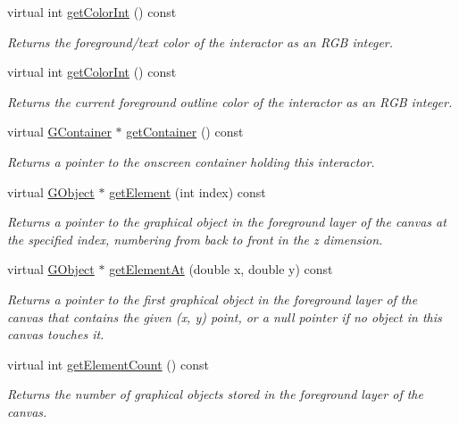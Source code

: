 \begin{DoxyCompactItemize}
virtual int \mbox{\hyperlink{classGInteractor_a9635c7af766cdc3417f346683fa0e6c1}{get\+Color\+Int}} () const
\begin{DoxyCompactList}\small\item\em Returns the foreground/text color of the interactor as an R\+GB integer. \end{DoxyCompactList}\item 
virtual int \mbox{\hyperlink{classGDrawingSurface_a9635c7af766cdc3417f346683fa0e6c1}{get\+Color\+Int}} () const
\begin{DoxyCompactList}\small\item\em Returns the current foreground outline color of the interactor as an R\+GB integer. \end{DoxyCompactList}\item 
virtual \mbox{\hyperlink{classGContainer}{G\+Container}} $\ast$ \mbox{\hyperlink{classGInteractor_a7a6e317c29d61030929b4cd2d1c00fe7}{get\+Container}} () const
\begin{DoxyCompactList}\small\item\em Returns a pointer to the onscreen container holding this interactor. \end{DoxyCompactList}\item 
virtual \mbox{\hyperlink{classGObject}{G\+Object}} $\ast$ \mbox{\hyperlink{classGCanvas_abde388cc529d22bb5f7f4a54d56049d8}{get\+Element}} (int index) const
\begin{DoxyCompactList}\small\item\em Returns a pointer to the graphical object in the foreground layer of the canvas at the specified index, numbering from back to front in the {\itshape z} dimension. \end{DoxyCompactList}\item 
virtual \mbox{\hyperlink{classGObject}{G\+Object}} $\ast$ \mbox{\hyperlink{classGCanvas_a25efa999eca5790ec26ef091b05f961c}{get\+Element\+At}} (double x, double y) const
\begin{DoxyCompactList}\small\item\em Returns a pointer to the first graphical object in the foreground layer of the canvas that contains the given (x, y) point, or a null pointer if no object in this canvas touches it. \end{DoxyCompactList}\item 
virtual int \mbox{\hyperlink{classGCanvas_adf7d37ec315f859648def92e6b32408f}{get\+Element\+Count}} () const
\begin{DoxyCompactList}\small\item\em Returns the number of graphical objects stored in the foreground layer of the canvas. \end{DoxyCompactList}\item 

\end{DoxyCompactItemize}
